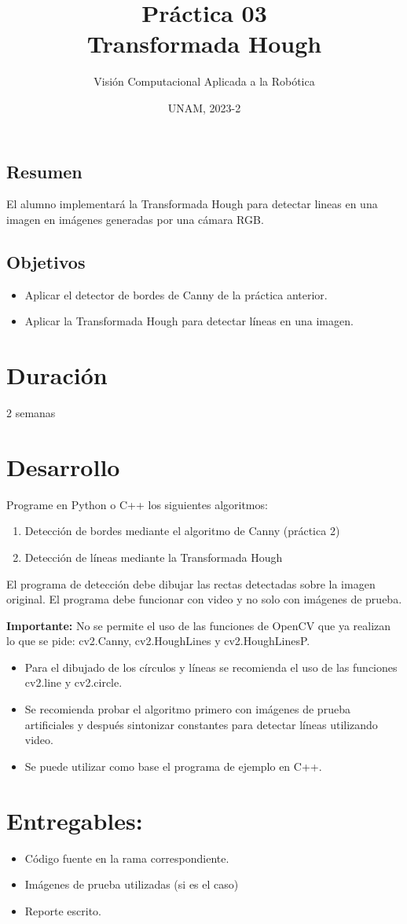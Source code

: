 \documentclass[letterpaper,11pt]{article}
\title{Práctica 03\\Transformada Hough}
\author{Visión Computacional Aplicada a la Robótica}
\date{UNAM, 2023-2}
\begin{document}
\renewcommand{\tablename}{Tabla}

\maketitle

\subsection*{Resumen}
El alumno implementará la Transformada Hough para detectar lineas en una imagen en imágenes generadas por una cámara RGB.


\subsection*{Objetivos}
\begin{itemize}
\item Aplicar el detector de bordes de Canny de la práctica anterior. 
\item Aplicar la Transformada Hough para detectar líneas en una imagen. 
\end{itemize}

\section*{Duración}
2 semanas

\section*{Desarrollo}
Programe en Python o C++ los siguientes algoritmos:

\begin{enumerate}
\item Detección de bordes mediante el algoritmo de Canny (práctica 2)
\item Detección de líneas mediante la Transformada Hough
\end{enumerate}

El programa de detección debe dibujar las rectas detectadas sobre la imagen original. El programa debe funcionar con video y no solo con imágenes de prueba. 

\textbf{Importante:} No se permite el uso de las funciones de OpenCV que ya realizan lo que se pide: cv2.Canny, cv2.HoughLines y cv2.HoughLinesP. 
\[\]
\begin{itemize}
\item Para el dibujado de los círculos y líneas se recomienda el uso de las funciones cv2.line y cv2.circle.
\item Se recomienda probar el algoritmo primero con imágenes de prueba artificiales y después sintonizar constantes para detectar líneas utilizando video.
\item Se puede utilizar como base el programa de ejemplo en C++. 
\end{itemize}

\section*{Entregables:}
\begin{itemize}
\item Código fuente en la rama correspondiente. 
\item Imágenes de prueba utilizadas (si es el caso)
\item Reporte escrito.
\end{itemize}
\end{document}
